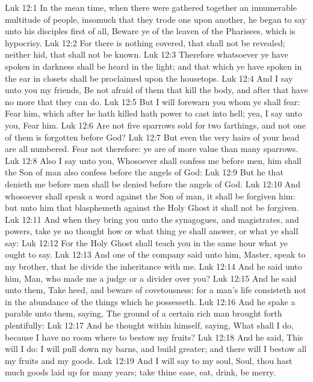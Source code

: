 \vs Luk 12:1 In the mean time, when there were gathered together an innumerable multitude of people, insomuch that they trode one upon another, he began to say unto his disciples first of all, Beware ye of the leaven of the Pharisees, which is hypocrisy.
\vs Luk 12:2 For there is nothing covered, that shall not be revealed; neither hid, that shall not be known.
\vs Luk 12:3 Therefore whatsoever ye have spoken in darkness shall be heard in the light; and that which ye have spoken in the ear in closets shall be proclaimed upon the housetops.
\vs Luk 12:4 And I say unto you my friends, Be not afraid of them that kill the body, and after that have no more that they can do.
\vs Luk 12:5 But I will forewarn you whom ye shall fear: Fear him, which after he hath killed hath power to cast into hell; yea, I say unto you, Fear him.
\vs Luk 12:6 Are not five sparrows sold for two farthings, and not one of them is forgotten before God?
\vs Luk 12:7 But even the very hairs of your head are all numbered. Fear not therefore: ye are of more value than many sparrows.
\vs Luk 12:8 Also I say unto you, Whosoever shall confess me before men, him shall the Son of man also confess before the angels of God:
\vs Luk 12:9 But he that denieth me before men shall be denied before the angels of God.
\vs Luk 12:10 And whosoever shall speak a word against the Son of man, it shall be forgiven him: but unto him that blasphemeth against the Holy Ghost it shall not be forgiven.
\vs Luk 12:11 And when they bring you unto the synagogues, and  magistrates, and powers, take ye no thought how or what thing ye shall answer, or what ye shall say:
\vs Luk 12:12 For the Holy Ghost shall teach you in the same hour what ye ought to say.
\vs Luk 12:13 And one of the company said unto him, Master, speak to my brother, that he divide the inheritance with me.
\vs Luk 12:14 And he said unto him, Man, who made me a judge or a divider over you?
\vs Luk 12:15 And he said unto them, Take heed, and beware of covetousness: for a man's life consisteth not in the abundance of the things which he possesseth.
\vs Luk 12:16 And he spake a parable unto them, saying, The ground of a certain rich man brought forth plentifully:
\vs Luk 12:17 And he thought within himself, saying, What shall I do, because I have no room where to bestow my fruits?
\vs Luk 12:18 And he said, This will I do: I will pull down my barns, and build greater; and there will I bestow all my fruits and my goods.
\vs Luk 12:19 And I will say to my soul, Soul, thou hast much goods laid up for many years; take thine ease, eat, drink,  be merry.
